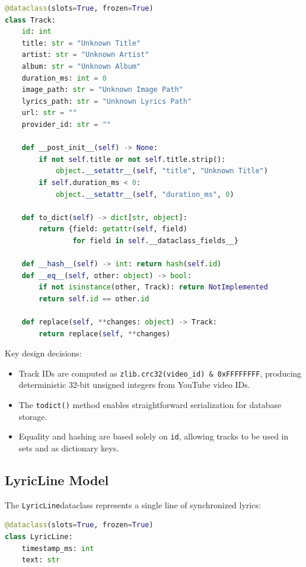 \documentclass[a4paper,11pt,twoside]{article}
\newcommand{\track}{\texttt{Track}}
\newcommand{\lyric}{\texttt{LyricLine}}
\DeclareRobustCommand{\method}[1]{\texttt{\def\_{\textunderscore\allowbreak}#1}}
\begin{document}
\begin{lstlisting}[language=Python, caption={The \track frozen dataclass with
default value normalization and functional update support.}]
@dataclass(slots=True, frozen=True)
class Track:
    id: int
    title: str = "Unknown Title"
    artist: str = "Unknown Artist"
    album: str = "Unknown Album"
    duration_ms: int = 0
    image_path: str = "Unknown Image Path"
    lyrics_path: str = "Unknown Lyrics Path"
    url: str = ""
    provider_id: str = ""

    def __post_init__(self) -> None:
        if not self.title or not self.title.strip():
            object.__setattr__(self, "title", "Unknown Title")
        if self.duration_ms < 0:
            object.__setattr__(self, "duration_ms", 0)

    def to_dict(self) -> dict[str, object]:
        return {field: getattr(self, field)
                for field in self.__dataclass_fields__}

    def __hash__(self) -> int: return hash(self.id)
    def __eq__(self, other: object) -> bool:
        if not isinstance(other, Track): return NotImplemented
        return self.id == other.id

    def replace(self, **changes: object) -> Track:
        return replace(self, **changes)
\end{lstlisting}

Key design decisions:
\begin{itemize}
    \item Track IDs are computed as \texttt{zlib.crc32(video\_id) \& 0xFFFFFFFF},
          producing deterministic 32-bit unsigned integers from YouTube video IDs.
    \item The \method{to\_dict()} method enables straightforward serialization
          for database storage.
    \item Equality and hashing are based solely on \texttt{id}, allowing tracks
          to be used in sets and as dictionary keys.
\end{itemize}

\subsection{LyricLine Model}

The \lyric dataclass represents a single line of synchronized lyrics:

\begin{lstlisting}[language=Python, caption={The \lyric frozen dataclass.}]
@dataclass(slots=True, frozen=True)
class LyricLine:
    timestamp_ms: int
    text: str
\end{lstlisting}
\end{document}
